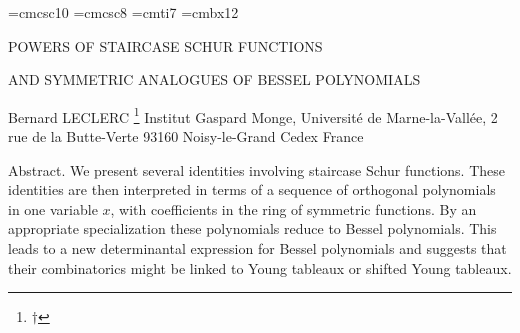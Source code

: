 
\overfullrule=0pt
\def\boxit#1#2{\setbox1=\hbox{\kern#1{#2}\kern#1}%
\dimen1=\ht1 \advance\dimen1 by #1 \dimen2=\dp1 \advance\dimen2 by #1
\setbox1=\hbox{\vrule height\dimen1 depth\dimen2\box1\vrule}%
\setbox1=\vbox{\hrule\box1\hrule}%
\advance\dimen1 by .4pt \ht1=\dimen1
\advance\dimen2 by .4pt \dp1=\dimen2 \box1\relax}
\def\tab#1{\boxit{1pt}{$\matrix{#1}$}}
\def\bitab#1{\boxit{1pt}{\boxit{1pt}{$\matrix{#1}$}}}
\def\bo#1{\boxit{1pt}{$#1$}}
\def\bol#1{\boxit{4pt}{$#1$}}
\def\bop#1{\boxit{3pt}{$#1$}}
\def\he{\hskip 1mm}
\def\th{\noalign{\smallskip}\noalign{\hrule}\noalign{\smallskip}}
\def\tvi{\vrule height 1pt depth 0pt width 0pt}
\font\petcap=cmcsc10
\font\tpetcap=cmcsc8
\font\petit=cmti7
\font\twelvebf=cmbx12
\centerline{\twelvebf POWERS OF STAIRCASE SCHUR FUNCTIONS}
\centerline{\twelvebf AND SYMMETRIC ANALOGUES OF BESSEL POLYNOMIALS}
\vskip 1cm
\centerline{Bernard LECLERC \footnote{$\dagger$}{
\sevenrm Institut Gaspard Monge, 
Universit\'e de Marne-la-Vall\'ee, 2 rue de la Butte-Verte 93160 
Noisy-le-Grand Cedex France}}
\vskip 1cm
{\sevenbf Abstract. }{\sevenrm  We present several identities involving 
staircase Schur functions. These identities are then interpreted in terms of 
a sequence of orthogonal polynomials in one variable ${\scriptstyle x}$, with 
coefficients in the ring of symmetric functions. By an appropriate 
specialization these polynomials reduce to Bessel polynomials. This leads to 
a new determinantal expression for Bessel polynomials and suggests that their 
combinatorics might be linked to Young tableaux or shifted Young 
tableaux.}\bigskip 

